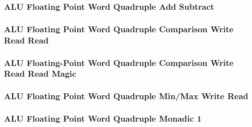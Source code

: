 

\subsubsection[{\small ALU Floating Point Word Quadruple Add Subtract}]{ALU Floating Point Word Quadruple Add Subtract} \label{sec:format-ALU-FWQADD}



\subsubsection[{\small ALU Floating Point Word Quadruple Comparison Write Read Read}]{ALU Floating Point Word Quadruple Comparison Write Read Read} \label{sec:format-ALU-FWQCWRR}



\subsubsection[{\small ALU Floating-Point Word Quadruple Comparison Write Read Read Magic}]{ALU Floating-Point Word Quadruple Comparison Write Read Read Magic} \label{sec:format-ALU-FWQCWRR.M}



\subsubsection[{\small ALU Floating Point Word Quadruple Min/Max Write Read}]{ALU Floating Point Word Quadruple Min/Max Write Read} \label{sec:format-ALU-FWQMMWR}



\subsubsection[{\small ALU Floating Point Word Quadruple Monadic 1}]{ALU Floating Point Word Quadruple Monadic 1} \label{sec:format-ALU-FWQMO1}

